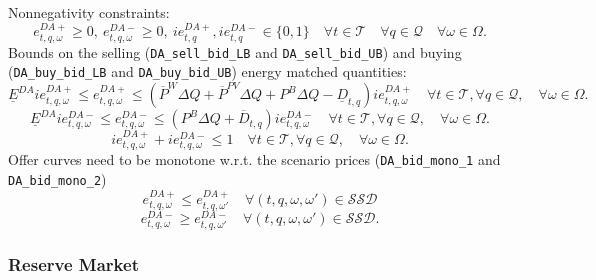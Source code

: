 Nonnegativity constraints:
\begin{equation} \label{EQ:DAVarDef2}
	e^{DA+}_{t,q, \omega} \geq 0, \ e^{DA-}_{t,q, \omega} \geq 0, \ ie^{DA+}_{t,q}, ie^{DA-}_{t,q} \in \{0, 1 \} \quad \forall t \in \mathcal{T} \quad \forall q \in \mathcal{Q} \quad \forall \omega \in \Omega.
\end{equation}
Bounds on the selling (\verb|DA_sell_bid_LB| and \verb|DA_sell_bid_UB|) and buying (\verb|DA_buy_bid_LB| and \verb|DA_buy_bid_UB|) energy matched quantities:
\begin{equation} \label{EQ:DA_sell_bid_LB2}
    \underline{E}^{DA} ie^{DA+}_{t,q, \omega} \leq e^{DA+}_{t,q, \omega} \leq (\overline{P}^W \Delta Q + \overline{P}^{PV} \Delta Q + P^B \Delta Q - \underline{D}_{t,q}) ie^{DA+}_{t,q, \omega}  \quad \forall t \in \mathcal{T}, \forall q \in \mathcal{Q}, \quad \forall \omega \in \Omega.
\end{equation}
\begin{equation} \label{EQ:DA_buy_bid_LB2}
	\underline{E}^{DA} ie^{DA-}_{t,q, \omega} \leq e^{DA-}_{t,q, \omega} \leq (P^B \Delta Q + \overline{D}_{t,q}) ie^{DA-}_{t,q, \omega} \quad \forall t \in \mathcal{T}, \forall q \in \mathcal{Q},\quad \forall \omega \in \Omega.
\end{equation}
\begin{equation} \label{EQ:DA_buy_or_sell2}
	ie^{DA+}_{t,q, \omega} + ie^{DA-}_{t,q, \omega} \leq 1 \quad \forall t \in \mathcal{T}, \forall q \in \mathcal{Q},\quad \forall \omega \in \Omega.
\end{equation}
Offer curves need to  be monotone w.r.t. the scenario prices (\verb|DA_bid_mono_1| and \verb|DA_bid_mono_2|)
\begin{equation} \label{EQ:DA_bid_mono_12}
	e^{DA+}_{t,q, \omega} \leq e^{DA+}_{t,q, \omega'} \quad \forall (t,q, \omega, \omega') \in \mathcal{SSD}
\end{equation}
\begin{equation} \label{EQ:DA_bid_mono_22}
	e^{DA-}_{t,q, \omega} \geq e^{DA-}_{t,q, \omega'} \quad \forall (t,q, \omega, \omega') \in \mathcal{SSD}.
\end{equation}

\subsubsection{Reserve Market}

